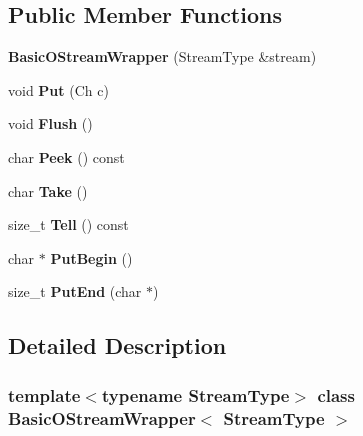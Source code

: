 \subsection*{Public Member Functions}
\begin{DoxyCompactItemize}
\item 
\mbox{\label{class_basic_o_stream_wrapper_a067a516c13b7c9d4dacef598d32779ef}} 
{\bfseries Basic\+O\+Stream\+Wrapper} (Stream\+Type \&stream)
\item 
\mbox{\label{class_basic_o_stream_wrapper_a7d3ba9d651fbe27fe05387f512154ea8}} 
void {\bfseries Put} (Ch c)
\item 
\mbox{\label{class_basic_o_stream_wrapper_a1c48a8b7520b0ab6ca34e665b928b56d}} 
void {\bfseries Flush} ()
\item 
\mbox{\label{class_basic_o_stream_wrapper_a6dc18ded82487d41a2d123e21a9e050b}} 
char {\bfseries Peek} () const
\item 
\mbox{\label{class_basic_o_stream_wrapper_a54be63e8d24f4d82329b860a907f65fe}} 
char {\bfseries Take} ()
\item 
\mbox{\label{class_basic_o_stream_wrapper_a62f214649fbfb8380a69fe92b864a61b}} 
size\+\_\+t {\bfseries Tell} () const
\item 
\mbox{\label{class_basic_o_stream_wrapper_a564b7b727bdab12185e7a7bd1ac5e822}} 
char $\ast$ {\bfseries Put\+Begin} ()
\item 
\mbox{\label{class_basic_o_stream_wrapper_a1da108e43a5a517c4484821fced1fca0}} 
size\+\_\+t {\bfseries Put\+End} (char $\ast$)
\end{DoxyCompactItemize}


\subsection{Detailed Description}
\subsubsection*{template$<$typename Stream\+Type$>$\newline
class Basic\+O\+Stream\+Wrapper$<$ Stream\+Type $>$}

